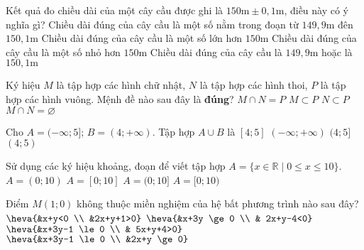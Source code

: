 \begin{ex}%
	Kết quả đo chiều dài của một cây cầu được ghi là $150\mathrm{m} \pm 0{,}1 \mathrm{m}$, điều này có ý nghĩa gì?
	\choice
	{\True Chiều dài đúng của cây cầu là một số nằm trong đoạn từ $149{,}9\mathrm{m}$ đên $150{,}1 \mathrm{m}$}
	{Chiều dài đúng của cây cầu là một số lớn hơn $150\mathrm{m}$}
	{Chiều dài đúng của cây cầu là một số nhỏ hơn $150\mathrm{m}$}
	{Chiều dài đúng của cây cầu là $149{,}9\mathrm{m}$ hoặc là $150{,}1 \mathrm{m}$}
\end{ex}

\begin{ex}%
	Ký hiệu $M$ là tập hợp các hình chữ nhật, $N$ là tập hợp các hình thoi, $P$ là tập hợp các hình vuông. Mệnh đề nào sau đây là \textbf{đúng}?
	\choice
	{\True $M \cap N=P$}
	{$M \subset P$}
	{$N \subset P$}
	{$M \cap N =\varnothing$}
\end{ex}


\begin{ex}%
Cho $A=(-\infty;5]$; $B=(4;+\infty)$. Tập hợp $A \cup B$ là	
	\choice
	{$[4;5]$}
	{\True $(-\infty;+\infty)$}
	{$(4;5]$}
	{$(4;5)$}
\end{ex}


\begin{ex}%
	Sử dụng các ký hiệu khoảng, đoạn để viết tập hợp $A=\{x \in \mathbb{R} \mid 0 \le x \le 10 \}$.
	\choice
	{$A=(0;10)$}
	{\True $A=[0;10]$}
	{$A=(0;10]$}
	{$A=[0;10)$}
\end{ex}

\begin{ex}%
	Điểm $M(1;0)$ không thuộc miền nghiệm của hệ bất phương trình nào sau đây?
	\choice
	{\True $\heva{&x+y<0 \\ &2x+y+1>0}$}
	{$\heva{&x+3y \ge 0 \\ & 2x+y-4<0}$}
	{$\heva{&x+3y-1 \le 0 \\ & 5x+y+4>0}$}
	{$\heva{&x+3y-1 \le 0 \\ &2x+y \ge 0}$}
\end{ex}

